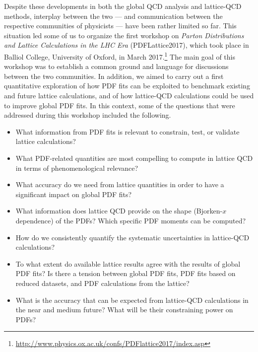 Despite these developments in both the global QCD analysis and lattice-QCD 
methods, interplay between the two --- and communication between the 
respective communities of physicists --- have been rather limited so far.
%
This situation led some of us to organize the first workshop on
{\it Parton Distributions and Lattice Calculations in the LHC Era}
(PDFLattice2017), which took place in Balliol College, University of 
Oxford, in March 2017.\footnote{\url{http://www.physics.ox.ac.uk/confs/PDFlattice2017/index.asp}}
%
The main goal of this workshop was to establish a common ground 
and language for discussions between the two communities.
%
In addition, we aimed to carry out a first quantitative exploration of how PDF 
fits can be exploited to benchmark existing and future lattice calculations,
and of how lattice-QCD calculations could be used to improve global PDF fits.
%
In this context, some of the questions that were addressed during this workshop
included the following.
\begin{itemize}
\item What information from PDF fits is relevant to constrain, 
  test, or validate lattice calculations?

\item What PDF-related quantities are most compelling
  to compute in lattice QCD in terms of phenomenological relevance?

\item What accuracy do we need from lattice quantities 
  in order to have a significant impact on global PDF fits?

\item What information does lattice QCD provide on the
  shape (Bjorken-$x$ dependence) of the PDFs? Which specific
  PDF moments can be computed?
  
\item How do we consistently quantify the systematic uncertainties 
  in lattice-QCD calculations?

\item To what extent do available lattice results agree with the results of
  global PDF fits? Is there a tension between global PDF fits, PDF
  fits based on reduced datasets, and PDF calculations from the lattice?

\item What is the accuracy that can be expected from lattice-QCD
  calculations in the near and medium future? What will be their
  constraining power on PDFs?

\end{itemize}

